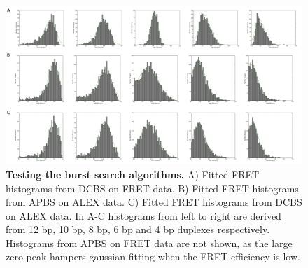 \begin{figure}[!ht]
   \begin{center}
      \includegraphics*[clip=true, width=6in]{pyFRET/burst_search.pdf}
      \caption{{\bf Testing the burst search algorithms.} A) Fitted FRET histograms from DCBS on FRET data. B) Fitted FRET histograms from APBS on ALEX data. C) Fitted FRET histograms from DCBS on ALEX data. In A-C histograms from left to right are derived from 12 bp, 10 bp, 8 bp, 6 bp and 4 bp duplexes respectively. Histograms from APBS on FRET data are not shown, as the large zero peak hampers gaussian fitting when the FRET efficiency is low.}
      \label{fig:burst_search}
   \end{center}
\end{figure}

